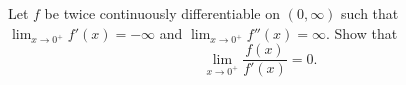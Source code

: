 Let $f$ be twice continuously differentiable on $(0,\infty)$ such that
$\lim_{x \to 0^{+}}f'(x)=-\infty$ and $\lim_{x \to 0^{+}}f''(x)=\infty$. Show that
$$\lim_{x\to 0^{+}}\frac{f(x)}{f'(x)}=0.$$